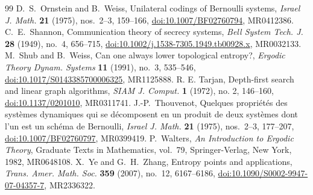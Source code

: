 \documentclass[10pt,a4paper]{amsart}
\numberwithin{equation}{section}
\begin{document}
\begin{thebibliography}{99}
 D.~S.~Ornstein and B.~Weiss, Unilateral codings of Bernoulli systems, \emph{Israel J. Math.} \textbf{21} (1975), nos.~2--3, 159--166, \href{https://doi.org/10.1007/BF02760794} {doi:10.1007/BF02760794}, MR0412386.
 C.~E.~Shannon, Communication theory of secrecy systems, \emph{Bell System Tech. J.} \textbf{28} (1949), no.~4, 656--715, \href{https://doi.org/10.1002/j.1538-7305.1949.tb00928.x} {doi:10.1002/j.1538-7305.1949.tb00928.x}, MR0032133.
 M.~Shub and B.~Weiss, Can one always lower topological entropy?, \emph{Ergodic Theory Dynam. Systems} \textbf{11} (1991), no.~3, 535--546, \href{https://doi.org/10.1017/S0143385700006325} {doi:10.1017/S0143385700006325}, MR1125888.
 R. E. Tarjan, Depth-first search and linear graph algorithms, \emph{SIAM J. Comput.} \textbf{1} (1972), no. 2, 146--160, \href{http://doi:10.1137/0201010}{doi:10.1137/0201010}, MR0311741.
 J.-P.~Thouvenot, Quelques propri\'et\'es des syst\`emes dynamiques qui se d\'ecomposent en un produit de deux syst\`emes dont l'un est un sch\'ema de Bernoulli, \emph{Israel J. Math.} \textbf{21} (1975), nos.~2--3, 177--207, \href{https://doi.org/10.1007/BF02760797} {doi:10.1007/BF02760797}, MR0399419.
 P.~Walters, \emph{An Introduction to Ergodic Theory}, Graduate Texts in Mathematics, vol.~79, Springer-Verlag, New York, 1982, MR0648108.
 X.~Ye and G.~H.~Zhang, Entropy points and applications, \emph{Trans. Amer. Math. Soc.} \textbf{359} (2007), no.~12, 6167--6186, \href{https://doi.org/10.1090/S0002-9947-07-04357-7} {doi:10.1090/S0002-9947-07-04357-7}, MR2336322.
\end{thebibliography}
\end{document}
